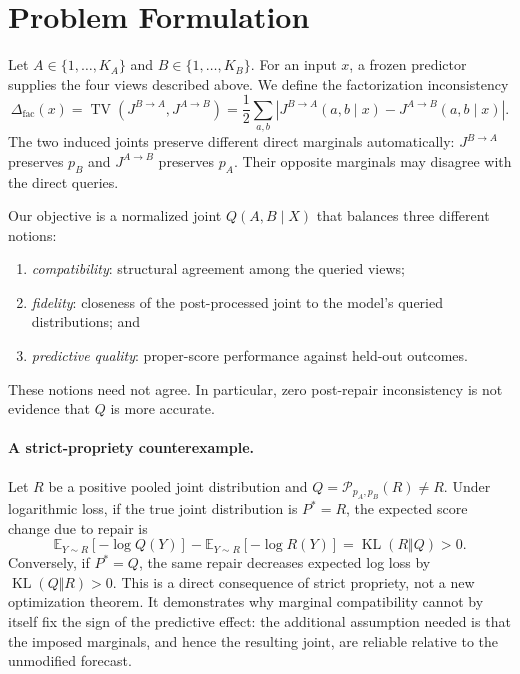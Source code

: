 \documentclass[a4paper,fleqn]{cas-sc}
\newcommand{\TV}{\operatorname{TV}}
\newcommand{\KL}{\operatorname{KL}}
\newcommand{\E}{\mathbb{E}}
\newcommand{\Jone}{J^{B\rightarrow A}}
\newcommand{\Jtwo}{J^{A\rightarrow B}}
\begin{document}
\section{Problem Formulation}
Let $A\in\{1,\ldots,K_A\}$ and $B\in\{1,\ldots,K_B\}$. For an input $x$, a frozen predictor supplies the four views described above. We define the factorization inconsistency
\begin{equation}
\Delta_{\mathrm{fac}}(x)=\TV\!\left(\Jone,\Jtwo\right)
=\frac{1}{2}\sum_{a,b}\left|\Jone(a,b\mid x)-\Jtwo(a,b\mid x)\right|.
\end{equation}
The two induced joints preserve different direct marginals automatically: $\Jone$ preserves $p_B$ and $\Jtwo$ preserves $p_A$. Their opposite marginals may disagree with the direct queries.

Our objective is a normalized joint $Q(A,B\mid X)$ that balances three different notions:
\begin{enumerate}
\item \emph{compatibility}: structural agreement among the queried views;
\item \emph{fidelity}: closeness of the post-processed joint to the model's queried distributions; and
\item \emph{predictive quality}: proper-score performance against held-out outcomes.
\end{enumerate}
These notions need not agree. In particular, zero post-repair inconsistency is not evidence that $Q$ is more accurate.

\paragraph{A strict-propriety counterexample.}
Let $R$ be a positive pooled joint distribution and $Q=\mathcal{P}_{p_A,p_B}(R)\ne R$. Under logarithmic loss, if the true joint distribution is $P^*=R$, the expected score change due to repair is
\begin{equation}
\E_{Y\sim R}[-\log Q(Y)]-\E_{Y\sim R}[-\log R(Y)]
=\KL(R\Vert Q)>0.
\end{equation}
Conversely, if $P^*=Q$, the same repair decreases expected log loss by $\KL(Q\Vert R)>0$. This is a direct consequence of strict propriety, not a new optimization theorem. It demonstrates why marginal compatibility cannot by itself fix the sign of the predictive effect: the additional assumption needed is that the imposed marginals, and hence the resulting joint, are reliable relative to the unmodified forecast.
\end{document}
